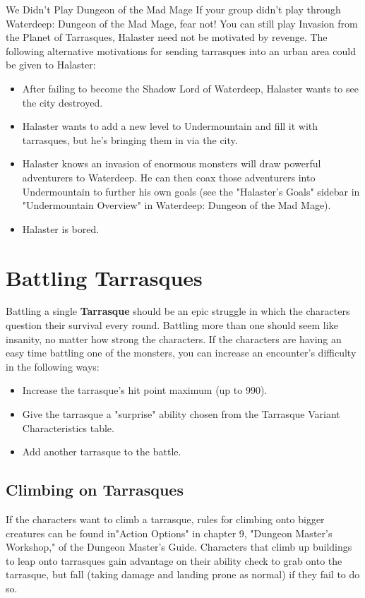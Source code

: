 \documentclass[10pt,a4paper,twoside,bg=print,twocolumn,openany,nodeprecatedcode]{dndbook}
\begin{document}
\begin{DndSidebar}[float=!b]{We Didn't Play Dungeon of the Mad Mage}
If your group didn't play through Waterdeep: Dungeon of the Mad Mage, fear not! You can still play Invasion from the Planet of Tarrasques, Halaster need not be motivated by revenge. The following alternative motivations for sending tarrasques into an urban area could be given to Halaster:




\begin{itemize}
\item After failing to become the Shadow Lord of Waterdeep, Halaster wants to see the city destroyed.
\item Halaster wants to add a new level to Undermountain and fill it with tarrasques, but he's bringing them in via the city.
\item Halaster knows an invasion of enormous monsters will draw powerful adventurers to Waterdeep. He can then coax those adventurers into Undermountain to further his own goals (see the "Halaster's Goals" sidebar in  "Undermountain Overview" in Waterdeep: Dungeon of the  Mad Mage).
\item Halaster is bored.
\end{itemize}



\end{DndSidebar}

\section{Battling Tarrasques}
Battling a single \textbf{Tarrasque} should be an epic struggle in which the characters question their survival every round. Battling more than one should seem like insanity, no matter how strong the characters. If the characters are having an easy time battling one of the monsters, you can increase an encounter's difficulty in the following ways:


\begin{itemize}
\item Increase the tarrasque's hit point maximum (up to  990).
\item Give the tarrasque a "surprise" ability chosen from the Tarrasque Variant Characteristics table.
\item Add another tarrasque to the battle.
\end{itemize}

\subsection{Climbing on Tarrasques}
If the characters want to climb a tarrasque, rules for climbing onto bigger creatures can be found in"Action Options" in chapter 9, "Dungeon Master's Workshop," of the Dungeon Master's Guide. Characters that climb up buildings to leap onto  tarrasques gain advantage on their ability check to  grab onto the tarrasque, but fall (taking damage and  landing prone as normal) if they fail to do so.
\end{document}
